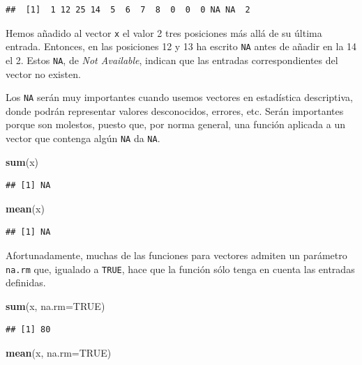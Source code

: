 \documentclass[]{book}
\newenvironment{Shaded}{\begin{snugshade}}{\end{snugshade}}
\newcommand{\DataTypeTok}[1]{\textcolor[rgb]{0.13,0.29,0.53}{#1}}
\newcommand{\KeywordTok}[1]{\textcolor[rgb]{0.13,0.29,0.53}{\textbf{#1}}}
\newcommand{\NormalTok}[1]{#1}
\newcommand{\OtherTok}[1]{\textcolor[rgb]{0.56,0.35,0.01}{#1}}
\theoremstyle{definition}
\theoremstyle{definition}
\theoremstyle{definition}
\theoremstyle{remark}
\begin{document}
\begin{verbatim}
##  [1]  1 12 25 14  5  6  7  8  0  0  0 NA NA  2
\end{verbatim}

Hemos añadido al vector \texttt{x} el valor 2 tres posiciones más allá de su última entrada. Entonces, en las posiciones 12 y 13 ha escrito \texttt{NA} antes de añadir en la 14 el 2. Estos \texttt{NA}, de \emph{Not Available}, indican que las entradas correspondientes del vector no existen.

Los \texttt{NA} serán muy importantes cuando usemos vectores en estadística descriptiva, donde podrán representar valores desconocidos, errores, etc.
Serán importantes porque son molestos, puesto que, por norma general, una función aplicada a un vector que contenga algún \texttt{NA} da \texttt{NA}.

\begin{Shaded}
\begin{Highlighting}[]
\KeywordTok{sum}\NormalTok{(x)}
\end{Highlighting}
\end{Shaded}

\begin{verbatim}
## [1] NA
\end{verbatim}

\begin{Shaded}
\begin{Highlighting}[]
\KeywordTok{mean}\NormalTok{(x)}
\end{Highlighting}
\end{Shaded}

\begin{verbatim}
## [1] NA
\end{verbatim}

Afortunadamente, muchas de las funciones para vectores admiten un parámetro \texttt{na.rm} que, igualado a \texttt{TRUE}, hace que la función sólo tenga en cuenta las entradas definidas.

\begin{Shaded}
\begin{Highlighting}[]
\KeywordTok{sum}\NormalTok{(x, }\DataTypeTok{na.rm=}\OtherTok{TRUE}\NormalTok{)}
\end{Highlighting}
\end{Shaded}

\begin{verbatim}
## [1] 80
\end{verbatim}

\begin{Shaded}
\begin{Highlighting}[]
\KeywordTok{mean}\NormalTok{(x, }\DataTypeTok{na.rm=}\OtherTok{TRUE}\NormalTok{)}
\end{Highlighting}
\end{Shaded}
\end{document}
